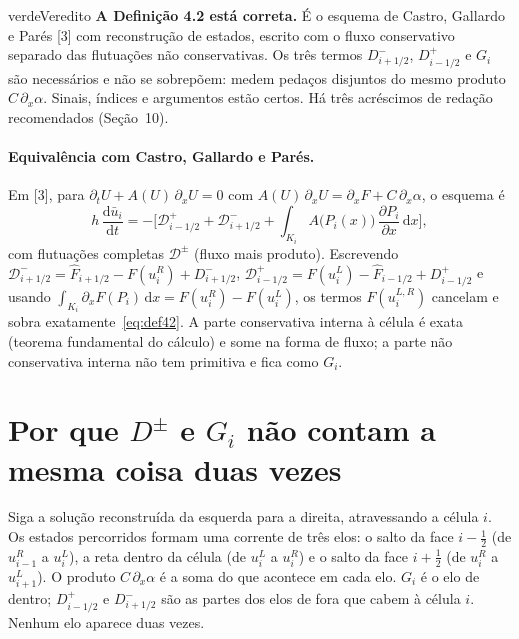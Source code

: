\documentclass[11pt,a4paper]{article}
\theoremstyle{definition}
\theoremstyle{remark}
\newcommand{\pd}[2]{\frac{\partial #1}{\partial #2}}
\newcommand{\dd}{\mathrm{d}}
\newcommand{\Fh}{\widehat F}
\newcommand{\ub}{\bar u}
\begin{document}
\begin{quadro}{verde}{Veredito}
\textbf{A Definição 4.2 está correta.} É o esquema de Castro, Gallardo e Parés [3] com reconstrução de estados, escrito com o fluxo conservativo separado das flutuações não conservativas. Os três termos $D^-_{i+1/2}$, $D^+_{i-1/2}$ e $G_i$ são necessários e não se sobrepõem: medem pedaços disjuntos do mesmo produto $C\,\partial_x\alpha$. Sinais, índices e argumentos estão certos. Há três acréscimos de redação recomendados (Seção~10).
\end{quadro}

\paragraph{Equivalência com Castro, Gallardo e Parés.} Em [3], para $\partial_tU+A(U)\,\partial_xU=0$ com $A(U)\,\partial_xU=\partial_xF+C\,\partial_x\alpha$, o esquema é
\[
h\,\frac{\dd\ub_i}{\dd t}=-\Big[\mathcal D^+_{i-1/2}+\mathcal D^-_{i+1/2}+\int_{K_i}A\big(P_i(x)\big)\,\pd{P_i}{x}\,\dd x\Big],
\]
com flutuações completas $\mathcal D^\pm$ (fluxo mais produto). Escrevendo $\mathcal D^-_{i+1/2}=\Fh_{i+1/2}-F(u_i^R)+D^-_{i+1/2}$, $\mathcal D^+_{i-1/2}=F(u_i^L)-\Fh_{i-1/2}+D^+_{i-1/2}$ e usando $\int_{K_i}\partial_xF(P_i)\,\dd x=F(u_i^R)-F(u_i^L)$, os termos $F(u_i^{L,R})$ cancelam e sobra exatamente~\eqref{eq:def42}. A parte conservativa interna à célula é exata (teorema fundamental do cálculo) e some na forma de fluxo; a parte não conservativa interna não tem primitiva e fica como $G_i$.

\section{Por que $D^\pm$ e $G_i$ não contam a mesma coisa duas vezes}

\begin{intuicao}
Siga a solução reconstruída da esquerda para a direita, atravessando a célula $i$. Os estados percorridos formam uma corrente de três elos: o salto da face $i-\frac12$ (de $u_{i-1}^R$ a $u_i^L$), a reta dentro da célula (de $u_i^L$ a $u_i^R$) e o salto da face $i+\frac12$ (de $u_i^R$ a $u_{i+1}^L$). O produto $C\,\partial_x\alpha$ é a soma do que acontece em cada elo. $G_i$ é o elo de dentro; $D^+_{i-1/2}$ e $D^-_{i+1/2}$ são as partes dos elos de fora que cabem à célula $i$. Nenhum elo aparece duas vezes.
\end{intuicao}
\end{document}
